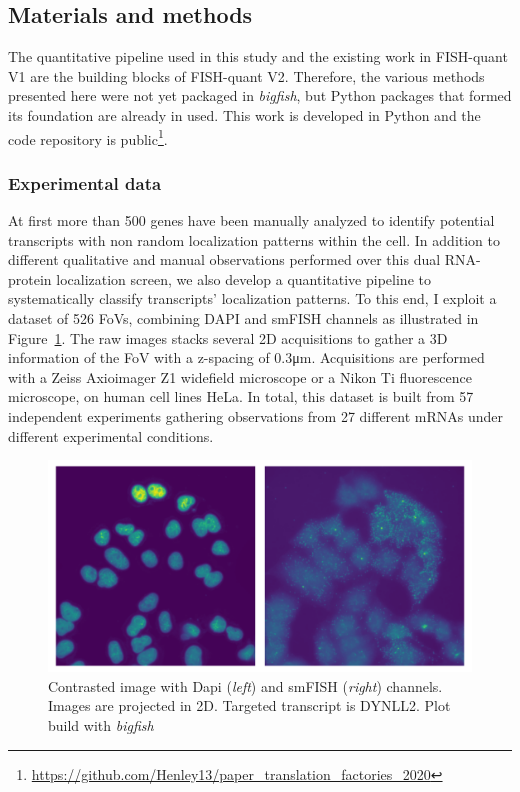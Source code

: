 \subsection{Materials and methods}
\label{subsec:materials_general_pattern}

The quantitative pipeline used in this study and the existing work in FISH-quant V1 are the building blocks of FISH-quant V2.
Therefore, the various methods presented here were not yet packaged in \emph{bigfish}, but Python packages that formed its foundation are already in used.
This work is developed in Python and the code repository is public\footnote{\url{https://github.com/Henley13/paper_translation_factories_2020}}.

\subsubsection{Experimental data}

At first more than 500 genes have been manually analyzed to identify potential transcripts with non random localization patterns within the cell.
In addition to different qualitative and manual observations performed over this dual \ac{RNA}-protein localization screen, we also develop a quantitative pipeline to systematically classify transcripts' localization patterns.
To this end, I exploit a dataset of 526 \ac{FoV}s, combining DAPI and \ac{smFISH} channels as illustrated in Figure~\ref{fig:fov_racha}.
The raw images stacks several 2D acquisitions to gather a 3D information of the \ac{FoV} with a z-spacing of 0.3μm.
Acquisitions are performed with a Zeiss Axioimager Z1 widefield microscope or a Nikon Ti fluorescence microscope, on human cell lines HeLa.
In total, this dataset is built from 57 independent experiments gathering observations from 27 different \ac{mRNA}s under different experimental conditions.

\begin{figure}[h]
    \centering
    \includegraphics[width=\textwidth]{figures/chapter5/FoV_DYNLL2}
    \caption{Contrasted image with Dapi (\textit{left}) and smFISH (\textit{right}) channels.
	Images are projected in 2D.
	Targeted transcript is DYNLL2.
	Plot build with \emph{bigfish}}
    \label{fig:fov_racha}
\end{figure}

